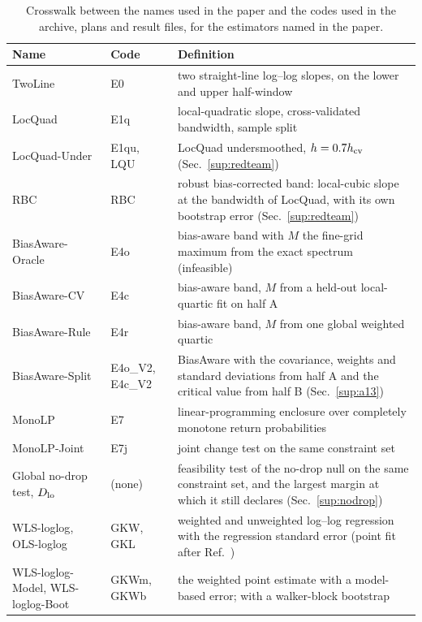 \documentclass[aps,pre,twocolumn,superscriptaddress,nofootinbib,10pt]{revtex4-2}
\begin{document}
\begin{table}[t]
\caption{Crosswalk between the names used in the paper and the codes used in the archive, plans and result files, for the estimators named in the paper.}
\label{tab:xnames}
\begin{ruledtabular}
\scriptsize
\begin{tabular}{p{}p{}p{}}
Name & Code & Definition \\
\hline
\textsf{TwoLine} & E0 & two straight-line log--log slopes, on the lower and upper half-window \\
\textsf{LocQuad} & E1q & local-quadratic slope, cross-validated bandwidth, sample split \\
\textsf{LocQuad-Under} & E1qu, LQU & \textsf{LocQuad} undersmoothed, $h=0.7h_{\rm cv}$ (Sec.~\ref{sup:redteam}) \\
\textsf{RBC} & RBC & robust bias-corrected band: local-cubic slope at the bandwidth of \textsf{LocQuad}, with its own bootstrap error (Sec.~\ref{sup:redteam}) \\
\textsf{BiasAware-Oracle} & E4o & bias-aware band with $M$ the fine-grid maximum from the exact spectrum (infeasible) \\
\textsf{BiasAware-CV} & E4c & bias-aware band, $M$ from a held-out local-quartic fit on half A \\
\textsf{BiasAware-Rule} & E4r & bias-aware band, $M$ from one global weighted quartic \\
\textsf{BiasAware-Split} & E4o\_V2, E4c\_V2 & \textsf{BiasAware} with the covariance, weights and standard deviations from half A and the critical value from half B (Sec.~\ref{sup:a13}) \\
\textsf{MonoLP} & E7 & linear-programming enclosure over completely monotone return probabilities \\
\textsf{MonoLP-Joint} & E7j & joint change test on the same constraint set \\
Global no-drop test, $D_{\rm lo}$ & (none) & feasibility test of the no-drop null on the same constraint set, and the largest margin at which it still declares (Sec.~\ref{sup:nodrop}) \\
\textsf{WLS-loglog}, \textsf{OLS-loglog} & GKW, GKL & weighted and unweighted log--log regression with the regression standard error (point fit after Ref.~\cite{gk2022}) \\
\textsf{WLS-loglog-Model}, \textsf{WLS-loglog-Boot} & GKWm, GKWb & the weighted point estimate with a model-based error; with a walker-block bootstrap \\
\end{tabular}
\end{ruledtabular}
\end{table}
\end{document}
